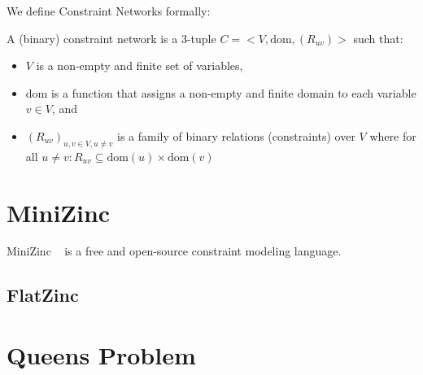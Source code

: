We define Constraint Networks formally:
\begin{tcolorbox}
	A (binary) constraint network is a 3-tuple $C = <V, \text{dom}, (R_{uv})>$ such that:
	\begin{itemize}
		\item $V$ is a non-empty and finite set of variables,
		\item dom is a function that assigns a non-empty and finite domain to each variable $v \in V$, and
		\item $(R_{uv})_{u,v \in V, u \neq v}$ is a family of binary relations (constraints) over $V$ where for all $u \neq v: R_{uv} \subseteq \text{dom}(u) \times \text{dom}(v)$
	\end{itemize}
\end{tcolorbox}

\section{MiniZinc}

MiniZinc ~\cite{minizinc:2007} is a free and open-source constraint modeling language.

\subsection{FlatZinc}

\section{Queens Problem}


